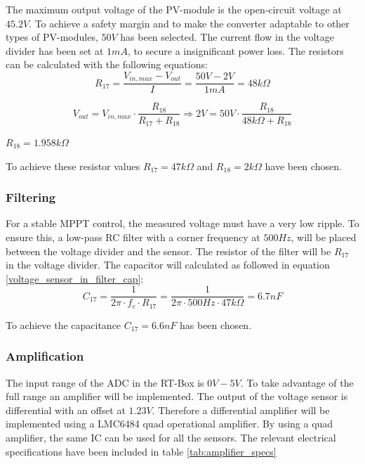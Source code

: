 The maximum output voltage of the PV-module is the open-circuit voltage at $45.2V$. To achieve a safety margin and to make the converter adaptable to other types of PV-modules, $50V$ has been selected. The current flow in the voltage divider has been set at $1mA$, to secure a insignificant power loss. The resistors can be calculated with the following equations:
\begin{equation} \label{voltage_divider_R17_in}
	R_{17} = \frac{V_{in,max}-V_{out}}{I} = \frac{50V-2V}{1mA} = 48k\Omega
\end{equation}

\begin{equation} \label{voltage_divider_R18_in}
	V_{out} = V_{in,max} \cdot \frac{R_{18}}{R_{17}+R_{18}} \Rightarrow 2V = 50V \cdot \frac{R_{18}}{48k\Omega+R_{18}}
\end{equation}
\begin{center}
	$R_{18} = 1.958k\Omega$
\end{center}

To achieve these resistor values $R_{17} = 47k\Omega$ and $R_{18} = 2k\Omega$ have been chosen. 

\subsubsection{Filtering} \label{voltage_sensor_filter}
For a stable MPPT control, the measured voltage must have a very low ripple. To ensure this, a low-pass RC filter with a corner frequency at $500Hz$, will be placed between the voltage divider and the sensor. The resistor of the filter will be $R_{17}$ in the voltage divider. The capacitor will calculated as followed in equation \ref{voltage_sensor_in_filter_cap}:
\begin{equation} \label{voltage_sensor_in_filter_cap}
	C_{17} = \frac{1}{2\pi \cdot f_c \cdot R_{17}} = \frac{1}{2 \pi \cdot 500Hz \cdot 47k\Omega} = 6.7nF
\end{equation}

To achieve the capacitance $C_{17} = 6.6nF$ has been chosen. 

\subsubsection{Amplification} \label{voltage_sensor_amplification}
The input range of the ADC in the RT-Box is $0V-5V$. To take advantage of the full range an amplifier will be implemented. The output of the voltage sensor is differential with an offset at $1.23V$. Therefore a differential amplifier will be implemented using a LMC6484  quad operational amplifier. By using a quad amplifier, the same IC can be used for all the sensors. The relevant electrical specifications have been included in table \ref{tab:amplifier_specs}


